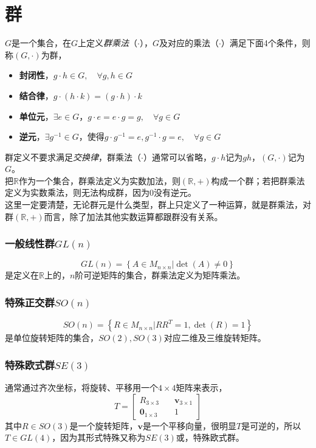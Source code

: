 \section{群}

$G$是一个集合，在$G$上定义\textit{群乘法}（$\cdot$），$G$及对应的乘法（$\cdot$）满足下面4个条件，则称$(G,\cdot)$为群，

\begin{itemize}
	\item \textbf{封闭性}，$g\cdot h \in G,\quad \forall g,h \in G$
	\item \textbf{结合律}，$g\cdot(h\cdot k) = (g\cdot h)\cdot k$
	\item \textbf{单位元}，$\exists e\in G$，$g\cdot e = e\cdot g = g,\quad \forall g \in G$
	\item \textbf{逆元}，$\exists g^{-1} \in G$，使得$g\cdot g^{-1} = e, g^{-1}\cdot g = e,\quad \forall g \in G$
\end{itemize}

群定义不要求满足\textit{交换律}，群乘法（$\cdot$）通常可以省略，$g\cdot h$记为$gh$，$(G,\cdot)$记为 $G$。\\

把$\mathbb{R}$作为一个集合，群乘法定义为实数加法，则$(\mathbb{R},+)$构成一个群；若把群乘法定义为实数乘法，则无法构成群，因为0没有逆元。\\

这里一定要清楚，无论群元是什么类型，群上只定义了一种运算，就是群乘法，对群$(\mathbb{R},+)$而言，除了加法其他实数运算都跟群没有关系。

\subsubsection*{\textbf{一般线性群}$GL(n)$}
$$
	GL(n) = \left\lbrace A \in M_{n\times n}|\det(A) \ne 0\right\rbrace
$$
是定义在$\mathbb{R}$上的，$n$阶可逆矩阵的集合，群乘法定义为矩阵乘法。

\subsubsection*{\textbf{特殊正交群}$SO(n)$}

$$
	SO(n) = \left\lbrace R \in M_{n\times n}|RR^T = 1,\det(R) =1\right\rbrace
$$
是单位旋转矩阵的集合，$SO(2),SO(3)$对应二维及三维旋转矩阵。

\subsubsection*{\textbf{特殊欧式群}$SE(3)$}
	通常通过齐次坐标，将旋转、平移用一个$4\times 4$矩阵来表示，
	$$
		T = \begin{bmatrix}
		R_{3\times 3} &\quad \mathbf{v}_{3\times 1}\\
		\mathbf{0}_{1\times 3} &\quad 1
		\end{bmatrix}
	$$
	其中$R \in SO(3)$是一个旋转矩阵，$\mathbf{v}$是一个平移向量，很明显$T$是可逆的，所以$T \in GL(4)$，因为其形式特殊又称为$SE(3)$或，特殊欧式群。\\


